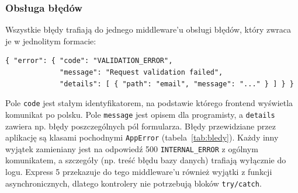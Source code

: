\subsubsection{Obsługa błędów}

Wszystkie błędy trafiają do jednego middleware'u obsługi błędów, który zwraca
je w jednolitym formacie:

\begin{small}
\begin{verbatim}
{ "error": { "code": "VALIDATION_ERROR",
             "message": "Request validation failed",
             "details": [ { "path": "email", "message": "..." } ] } }
\end{verbatim}
\end{small}

Pole \texttt{code} jest stałym identyfikatorem, na podstawie którego frontend
wyświetla komunikat po polsku. Pole \texttt{message} jest opisem dla
programisty, a \texttt{details} zawiera np. błędy poszczególnych pól formularza.
Błędy przewidziane przez aplikację są klasami pochodnymi \texttt{AppError}
(tabela~\ref{tab:bledy}). Każdy inny wyjątek zamieniany jest na odpowiedź
500 \texttt{INTERNAL\_ERROR} z ogólnym komunikatem, a szczegóły (np. treść
błędu bazy danych) trafiają wyłącznie do logu. Express 5 przekazuje do tego
middleware'u również wyjątki z funkcji asynchronicznych, dlatego kontrolery
nie potrzebują bloków \texttt{try/catch}.

